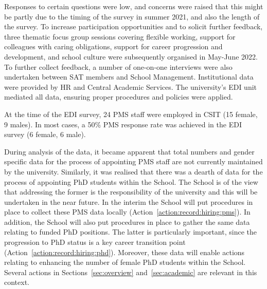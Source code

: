 



Responses to certain questions were low, and concerns were raised that this might be partly due to the timing of the survey in summer 2021, and also the length of the survey. To increase participation opportunities and to solicit further feedback, three thematic focus group sessions covering flexible working, support for colleagues with caring obligations, support for career progression and development, and school culture were subsequently organised in May-June 2022. To further collect feedback, a number of one-on-one interviews were also undertaken between SAT members and School Management.
Institutional data were provided by \ac{HR} and Central Academic Services. The university's EDI unit mediated all data, ensuring proper procedures and policies were applied.  

At the time of the EDI survey, 24 PMS staff were employed in CSIT (15 female, 9 males). 
In most cases, a 50\% PMS response rate was achieved in the EDI survey (6 female, 6 male). %

During analysis of the data, it became apparent that total numbers and gender specific data for the process of appointing PMS staff are not currently maintained by the university.
Similarly, it was realised that there was a dearth of data for the process of appointing PhD students within the School. 
The School is of the view that addressing the former is the responsibility of the university and this will be undertaken in the near future.
In the interim the School will put procedures in place to collect these PMS data locally  (Action~\ref{action:record:hiring:pms}). 
In addition, the School will also put procedures in place to gather the same data relating to funded PhD positions. The latter is particularly important, since the progression to PhD status is a key career transition point (Action~\ref{action:record:hiring:phd}). Moreover, these data will enable actions relating to enhancing the number of female PhD students within the School. Several actions in Sections~\ref{sec:overview} and~\ref{sec:academic} are relevant in this context. %


